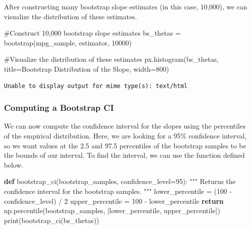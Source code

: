 \documentclass[
  letterpaper,
  DIV=11,
  numbers=noendperiod]{scrreprt}
\newenvironment{Shaded}{\begin{snugshade}}{\end{snugshade}}
\newcommand{\BuiltInTok}[1]{\textcolor[rgb]{0.00,0.23,0.31}{#1}}
\newcommand{\CommentTok}[1]{\textcolor[rgb]{0.37,0.37,0.37}{#1}}
\newcommand{\ControlFlowTok}[1]{\textcolor[rgb]{0.00,0.23,0.31}{\textbf{#1}}}
\newcommand{\DecValTok}[1]{\textcolor[rgb]{0.68,0.00,0.00}{#1}}
\newcommand{\KeywordTok}[1]{\textcolor[rgb]{0.00,0.23,0.31}{\textbf{#1}}}
\newcommand{\NormalTok}[1]{\textcolor[rgb]{0.00,0.23,0.31}{#1}}
\newcommand{\OperatorTok}[1]{\textcolor[rgb]{0.37,0.37,0.37}{#1}}
\newcommand{\StringTok}[1]{\textcolor[rgb]{0.13,0.47,0.30}{#1}}
\begin{document}
After constructing many bootstrap slope estimates (in this case,
10,000), we can visualize the distribution of these estimates.

\begin{Shaded}
\begin{Highlighting}[]
\CommentTok{\#Construct 10,000 bootstrap slope estimates}
\NormalTok{bs\_thetas }\OperatorTok{=}\NormalTok{ bootstrap(mpg\_sample, estimator, }\DecValTok{10000}\NormalTok{)}

\CommentTok{\#Visualize the distribution of these estimates}
\NormalTok{px.histogram(bs\_thetas, title}\OperatorTok{=}\StringTok{\textquotesingle{}Bootstrap Distribution of the Slope\textquotesingle{}}\NormalTok{, }
\NormalTok{             width}\OperatorTok{=}\DecValTok{800}\NormalTok{)}
\end{Highlighting}
\end{Shaded}

\begin{verbatim}
Unable to display output for mime type(s): text/html
\end{verbatim}

\subsubsection{Computing a Bootstrap CI}\label{computing-a-bootstrap-ci}

We can now compute the confidence interval for the slopes using the
percentiles of the empirical distribution. Here, we are looking for a
95\% confidence interval, so we want values at the 2.5 and 97.5
percentiles of the bootstrap samples to be the bounds of our interval.
To find the interval, we can use the function defined below.

\begin{Shaded}
\begin{Highlighting}[]
\KeywordTok{def}\NormalTok{ bootstrap\_ci(bootstrap\_samples, confidence\_level}\OperatorTok{=}\DecValTok{95}\NormalTok{):}
    \CommentTok{"""}
\CommentTok{    Returns the confidence interval for the bootstrap samples.}
\CommentTok{    """}
\NormalTok{    lower\_percentile }\OperatorTok{=}\NormalTok{ (}\DecValTok{100} \OperatorTok{{-}}\NormalTok{ confidence\_level) }\OperatorTok{/} \DecValTok{2}
\NormalTok{    upper\_percentile }\OperatorTok{=} \DecValTok{100} \OperatorTok{{-}}\NormalTok{ lower\_percentile}
    \ControlFlowTok{return}\NormalTok{ np.percentile(bootstrap\_samples, [lower\_percentile, upper\_percentile])}
\BuiltInTok{print}\NormalTok{(bootstrap\_ci(bs\_thetas))}
\end{Highlighting}
\end{Shaded}
\end{document}

